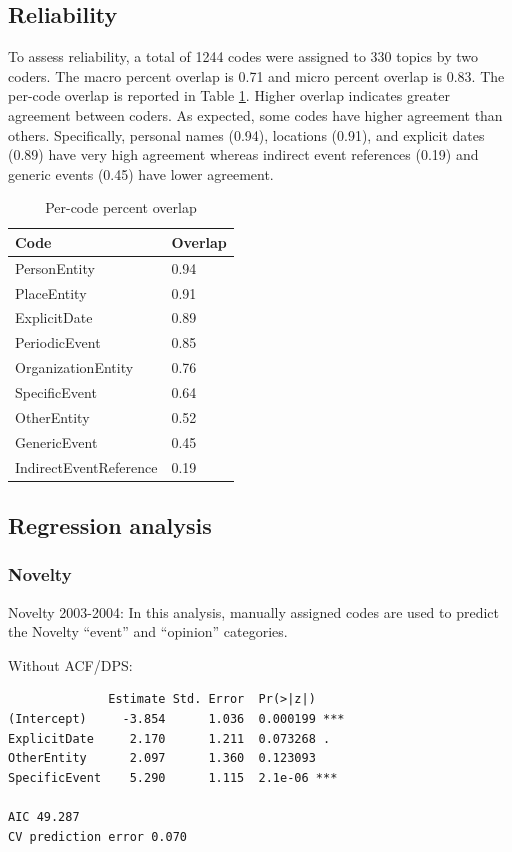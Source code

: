 \documentclass{sig-alternate}
\begin{document}
\subsection{Reliability}

To assess reliability, a total of 1244 codes were assigned to 330 topics by two coders.  The macro percent overlap is 0.71 and  micro percent overlap is 0.83.  The per-code overlap is reported in Table \ref{table.overlap}.  Higher overlap indicates greater agreement between coders. As expected, some codes have higher agreement than others. Specifically, personal names (0.94), locations (0.91), and explicit dates (0.89) have very high agreement whereas indirect event references (0.19) and generic events (0.45) have lower agreement.

\begin{table}
\small
\begin{tabular}{| l | l |} \hline
\bf{Code} & \bf{Overlap}  \\ \hline
PersonEntity & 0.94  \\ \hline
PlaceEntity  & 0.91  \\ \hline
ExplicitDate & 0.89   \\ \hline
PeriodicEvent & 0.85   \\ \hline
OrganizationEntity & 0.76  \\ \hline
SpecificEvent & 0.64  \\ \hline
OtherEntity & 0.52  \\ \hline
GenericEvent & 0.45  \\ \hline
IndirectEventReference & 0.19  \\ \hline
\end{tabular}
\caption{Per-code percent overlap }
\label{table.overlap}
\end{table}

\subsection{Regression analysis}

\subsubsection{Novelty}
Novelty 2003-2004: In this analysis, manually assigned codes are used to predict the Novelty ``event'' and ``opinion'' categories. 

Without ACF/DPS:
\begin{verbatim}
              Estimate Std. Error  Pr(>|z|)    
(Intercept)     -3.854      1.036  0.000199 ***
ExplicitDate     2.170      1.211  0.073268 .  
OtherEntity      2.097      1.360  0.123093    
SpecificEvent    5.290      1.115  2.1e-06 ***

AIC 49.287
CV prediction error 0.070
\end{verbatim}
\end{document}

